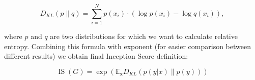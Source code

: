\documentclass[12pt,a4paper,openany]{book}
\begin{document}
\begin{equation}
D_{K L}(p \| q)=\sum_{i=1}^{N} p\left(x_{i}\right) \cdot\left(\log p\left(x_{i}\right)-\log q\left(x_{i}\right)\right),
\end{equation}

\noindent where $p$ and $q$ are two distributions for which we want to calculate relative entropy. Combining this formula with exponent (for easier comparison between different results) we obtain final Inception Score definition:

\begin{equation}
\operatorname{IS}(G)=\exp \left(\mathbb{E}_{\mathbf{x}} D_{K L}(p(y|x) \| p(y))\right)
\end{equation}

%

%
%
%
%
%
\end{document}
